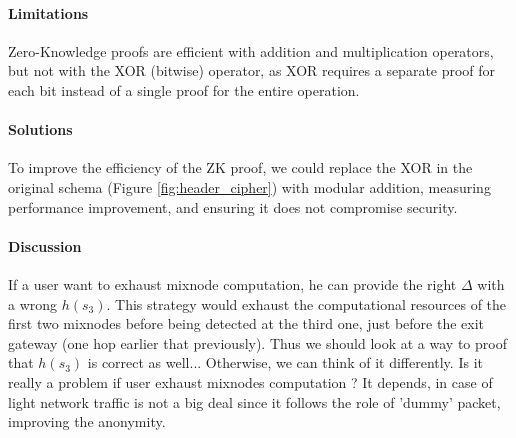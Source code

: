 \paragraph{Limitations} Zero-Knowledge proofs are efficient with addition and multiplication operators, but not with the XOR (bitwise) operator, as XOR requires a separate proof for each bit instead of a single proof for the entire operation.

\paragraph{Solutions} To improve the efficiency of the ZK proof, we could replace the XOR in the original schema (Figure \ref{fig:header_cipher}) with modular addition, measuring performance improvement, and ensuring it does not compromise security.

\paragraph{Discussion} If a user want to exhaust mixnode computation, he can provide the right $\Delta$ with a wrong $h(s_3)$. 
This strategy would exhaust the computational resources of the first two mixnodes before being detected at the third one, just before the exit gateway (one hop earlier that previously).
Thus we should look at a way to proof that $h(s_3)$ is correct as well... %
Otherwise, we can think of it differently. 
Is it really a problem if user exhaust mixnodes computation ? 
It depends, in case of light network traffic is not a big deal since it follows the role of 'dummy' packet, improving the anonymity.
